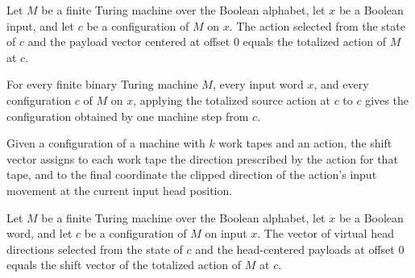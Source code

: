 \begin{lemma}
\label{Complexity.obliviousSourceAction_correct}
\leanok
{}
Let $M$ be a finite Turing machine over the Boolean alphabet, let $x$ be a Boolean
input, and let $c$ be a configuration of $M$ on $x$. The action selected from the state
of $c$ and the payload vector centered at offset $0$ equals the totalized action of $M$
at $c$.
\end{lemma}

\begin{lemma}
\label{Complexity.sourceTotalAction_apply}
\leanok
{}
For every finite binary Turing machine $M$, every input word $x$, and every
configuration $c$ of $M$ on $x$, applying the totalized source action at $c$ to $c$
gives the configuration obtained by one machine step from $c$.
\end{lemma}

\begin{definition}
\label{Complexity.sourceShift}
\leanok
{}
Given a configuration of a machine with $k$ work tapes and an action, the shift vector
assigns to each work tape the direction prescribed by the action for that tape, and to
the final coordinate the clipped direction of the action's input movement at the
current input head position.
\end{definition}

\begin{lemma}
\label{Complexity.obliviousSourceMove_correct}
\leanok
{}
Let $M$ be a finite Turing machine over the Boolean alphabet, let $x$ be a Boolean word,
and let $c$ be a configuration of $M$ on input $x$. The vector of virtual head
directions selected from the state of $c$ and the head-centered payloads at offset $0$
equals the shift vector of the totalized action of $M$ at $c$.
\end{lemma}

